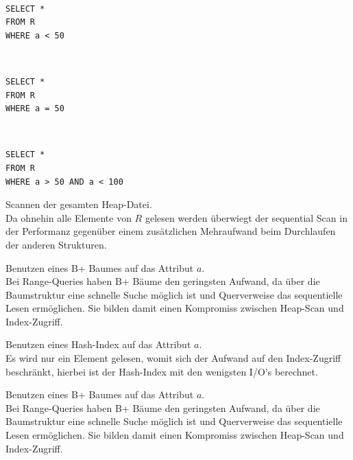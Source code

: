 \documentclass{uni_tue_template}
\begin{document}
  \item \hfill\\
\begin{lstlisting}
SELECT *
FROM R
WHERE a < 50
\end{lstlisting}
  \item \hfill\\
\begin{lstlisting}
SELECT *
FROM R
WHERE a = 50
\end{lstlisting}
  \item \hfill\\
\begin{lstlisting}
SELECT *
FROM R
WHERE a > 50 AND a < 100
\end{lstlisting}
\subExEnd{}
  \item Scannen der gesamten Heap-Datei.\\
  Da ohnehin alle Elemente von $R$ gelesen werden überwiegt der sequential Scan in der Performanz gegenüber einem zusätzlichen Mehraufwand beim Durchlaufen der anderen Strukturen.
  \item Benutzen eines B+ Baumes auf das Attribut $a$.\\
  Bei Range-Queries haben B+ Bäume den geringsten Aufwand, da über die Baumstruktur eine schnelle Suche möglich ist und Querverweise das sequentielle Lesen ermöglichen. Sie bilden damit einen Kompromiss zwischen Heap-Scan und Index-Zugriff.
  \item Benutzen eines Hash-Index auf das Attribut $a$.\\
  Es wird nur ein Element gelesen, womit sich der Aufwand auf den Index-Zugriff beschränkt, hierbei ist der Hash-Index mit den wenigsten I/O's berechnet.
  \item Benutzen eines B+ Baumes auf das Attribut $a$.\\
  Bei Range-Queries haben B+ Bäume den geringsten Aufwand, da über die Baumstruktur eine schnelle Suche möglich ist und Querverweise das sequentielle Lesen ermöglichen. Sie bilden damit einen Kompromiss zwischen Heap-Scan und Index-Zugriff.
\subExEnd{}
\end{document}
